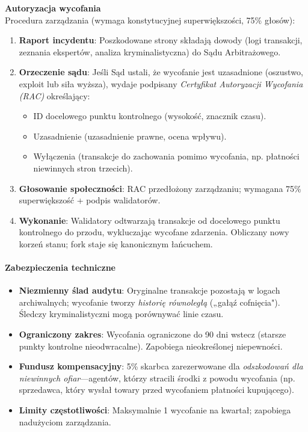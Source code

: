 \documentclass[11pt]{article}
\begin{document}
\textbf{Autoryzacja wycofania}\\
Procedura zarządzania (wymaga konstytucyjnej superwiększości, 75\% głosów):
\begin{enumerate}[noitemsep]
  \item \textbf{Raport incydentu}: Poszkodowane strony składają dowody (logi transakcji, zeznania ekspertów, analiza kryminalistyczna) do Sądu Arbitrażowego.
  \item \textbf{Orzeczenie sądu}: Jeśli Sąd ustali, że wycofanie jest uzasadnione (oszustwo, exploit lub siła wyższa), wydaje podpisany \emph{Certyfikat Autoryzacji Wycofania (RAC)} określający:
    \begin{itemize}[noitemsep]
      \item ID docelowego punktu kontrolnego (wysokość, znacznik czasu).
      \item Uzasadnienie (uzasadnienie prawne, ocena wpływu).
      \item Wyłączenia (transakcje do zachowania pomimo wycofania, np. płatności niewinnych stron trzecich).
    \end{itemize}
  \item \textbf{Głosowanie społeczności}: RAC przedłożony zarządzaniu; wymagana 75\% superwiększość + podpis walidatorów.
  \item \textbf{Wykonanie}: Walidatory odtwarzają transakcje od docelowego punktu kontrolnego do przodu, wykluczając wycofane zdarzenia. Obliczany nowy korzeń stanu; fork staje się kanonicznym łańcuchem.
\end{enumerate}

\paragraph{Zabezpieczenia techniczne}
\begin{itemize}[noitemsep]
  \item \textbf{Niezmienny ślad audytu}: Oryginalne transakcje pozostają w logach archiwalnych; wycofanie tworzy \emph{historię równoległą} („gałąź cofnięcia"). Śledczy kryminalistyczni mogą porównywać linie czasu.
  \item \textbf{Ograniczony zakres}: Wycofania ograniczone do 90 dni wstecz (starsze punkty kontrolne nieodwracalne). Zapobiega nieokreślonej niepewności.
  \item \textbf{Fundusz kompensacyjny}: 5\% skarbca zarezerwowane dla \emph{odszkodowań dla niewinnych ofiar}—agentów, którzy stracili środki z powodu wycofania (np. sprzedawca, który wysłał towary przed wycofaniem płatności kupującego).
  \item \textbf{Limity częstotliwości}: Maksymalnie 1 wycofanie na kwartał; zapobiega nadużyciom zarządzania.
\end{itemize}
\end{document}
